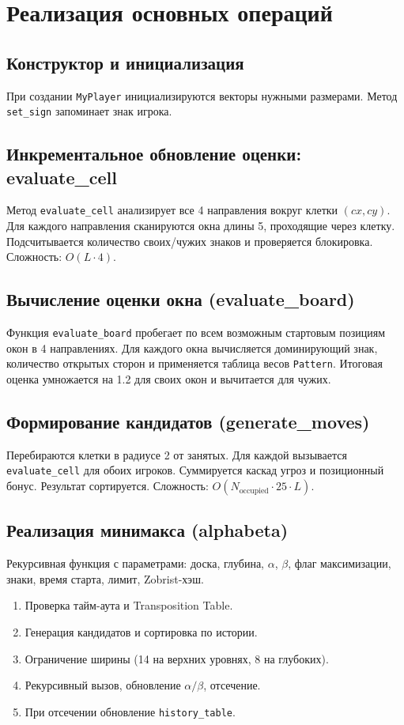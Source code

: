 \documentclass[a4paper,14pt]{extreport}
\begin{document}
\section{Реализация основных операций}
\subsection{Конструктор и инициализация}
При создании \texttt{MyPlayer} инициализируются векторы нужными размерами. Метод \texttt{set\_sign} запоминает знак игрока.

\subsection{Инкрементальное обновление оценки: evaluate\_cell}
Метод \texttt{evaluate\_cell} анализирует все 4 направления вокруг клетки $(cx, cy)$. Для каждого направления сканируются окна длины 5, проходящие через клетку. Подсчитывается количество своих/чужих знаков и проверяется блокировка. Сложность: $O(L \cdot 4)$.

\subsection{Вычисление оценки окна (evaluate\_board)}
Функция \texttt{evaluate\_board} пробегает по всем возможным стартовым позициям окон в 4 направлениях. Для каждого окна вычисляется доминирующий знак, количество открытых сторон и применяется таблица весов \texttt{Pattern}. Итоговая оценка умножается на 1.2 для своих окон и вычитается для чужих.

\subsection{Формирование кандидатов (generate\_moves)}
Перебираются клетки в радиусе 2 от занятых. Для каждой вызывается \texttt{evaluate\_cell} для обоих игроков. Суммируется каскад угроз и позиционный бонус. Результат сортируется. Сложность: $O(N_{\text{occupied}} \cdot 25 \cdot L)$.

\subsection{Реализация минимакса (alphabeta)}
Рекурсивная функция с параметрами: доска, глубина, $\alpha$, $\beta$, флаг максимизации, знаки, время старта, лимит, Zobrist-хэш.
\begin{enumerate}
    \item Проверка тайм-аута и Transposition Table.
    \item Генерация кандидатов и сортировка по истории.
    \item Ограничение ширины (14 на верхних уровнях, 8 на глубоких).
    \item Рекурсивный вызов, обновление $\alpha/\beta$, отсечение.
    \item При отсечении обновление \texttt{history\_table}.
\end{enumerate}
\end{document}
